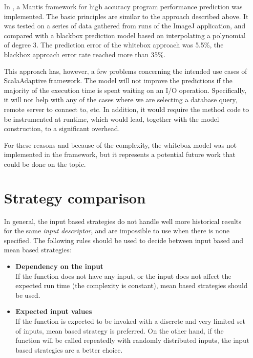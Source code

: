 In \cite{chun_mantis:_2010}, a Mantis framework for high accuracy program performance prediction was implemented. The basic principles are similar to the approach described above. It was tested on a series of data gathered from runs of the ImageJ application, and compared with a blackbox prediction model based on interpolating a polynomial of degree 3. The prediction error of the whitebox approach was 5.5\%, the blackbox approach error rate reached more than 35\%.

This approach has, however, a few problems concerning the intended use cases of ScalaAdaptive framework. The model will not improve the predictions if the majority of the execution time is spent waiting on an I/O operation. Specifically, it will not help with any of the cases where we are selecting a database query, remote server to connect to, etc. In addition, it would require the method code to be instrumented at runtime, which would lead, together with the model construction, to a significant overhead.

For these reasons and because of the complexity, the whitebox model was not implemented in the framework, but it represents a potential future work that could be done on the topic.

\section{Strategy comparison}
\label{sec:strategy_comparison}

In general, the input based strategies do not handle well more historical results for the same \textit{input descriptor}, and are impossible to use when there is none specified. The following rules should be used to decide between input based and mean based strategies:

\begin{itemize}
	\item \textbf{Dependency on the input} \\
	If the function does not have any input, or the input does not affect the expected run time (the complexity is constant), mean based strategies should be used.
	\item \textbf{Expected input values} \\
	If the function is expected to be invoked with a discrete and very limited set of inputs, mean based strategy is preferred. On the other hand, if the function will be called repeatedly with randomly distributed inputs, the input based strategies are a better choice.
\end{itemize}

